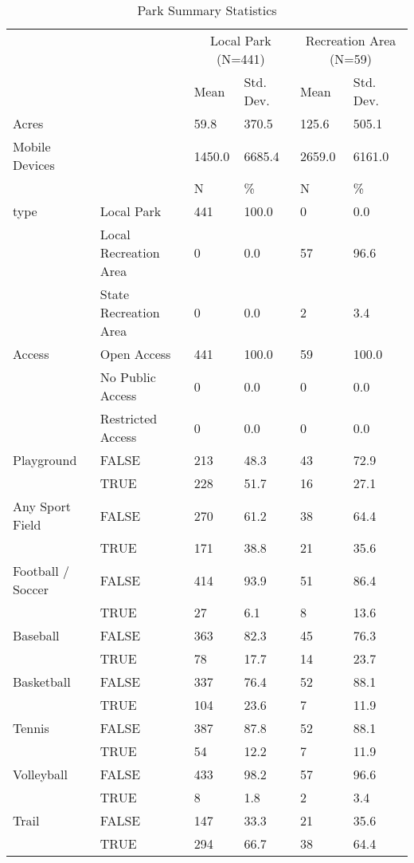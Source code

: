 \documentclass[3p, authoryear, review]{elsarticle} %
\begin{document}
\begin{table}

\caption{\label{tab:parkstable}Park Summary Statistics}
\centering
\begin{tabular}[t]{llllll}
\toprule
\multicolumn{2}{c}{ } & \multicolumn{2}{c}{Local Park (N=441)} & \multicolumn{2}{c}{Recreation Area (N=59)} \\
\cmidrule(l{3pt}r{3pt}){3-4} \cmidrule(l{3pt}r{3pt}){5-6}
  &    & Mean & Std. Dev. & Mean  & Std. Dev. \\
\midrule
Acres &  & 59.8 & 370.5 & 125.6 & 505.1\\
Mobile Devices &  & 1450.0 & 6685.4 & 2659.0 & 6161.0\\
\midrule
 &  & N & \% & N & \%\\
type & Local Park & 441 & 100.0 & 0 & 0.0\\
 & Local Recreation Area & 0 & 0.0 & 57 & 96.6\\
 & State Recreation Area & 0 & 0.0 & 2 & 3.4\\
Access & Open Access & 441 & 100.0 & 59 & 100.0\\
 & No Public Access & 0 & 0.0 & 0 & 0.0\\
 & Restricted Access & 0 & 0.0 & 0 & 0.0\\
Playground & FALSE & 213 & 48.3 & 43 & 72.9\\
 & TRUE & 228 & 51.7 & 16 & 27.1\\
Any Sport Field & FALSE & 270 & 61.2 & 38 & 64.4\\
 & TRUE & 171 & 38.8 & 21 & 35.6\\
Football / Soccer & FALSE & 414 & 93.9 & 51 & 86.4\\
 & TRUE & 27 & 6.1 & 8 & 13.6\\
Baseball & FALSE & 363 & 82.3 & 45 & 76.3\\
 & TRUE & 78 & 17.7 & 14 & 23.7\\
Basketball & FALSE & 337 & 76.4 & 52 & 88.1\\
 & TRUE & 104 & 23.6 & 7 & 11.9\\
Tennis & FALSE & 387 & 87.8 & 52 & 88.1\\
 & TRUE & 54 & 12.2 & 7 & 11.9\\
Volleyball & FALSE & 433 & 98.2 & 57 & 96.6\\
 & TRUE & 8 & 1.8 & 2 & 3.4\\
Trail & FALSE & 147 & 33.3 & 21 & 35.6\\
 & TRUE & 294 & 66.7 & 38 & 64.4\\
\bottomrule
\end{tabular}
\end{table}
\end{document}
